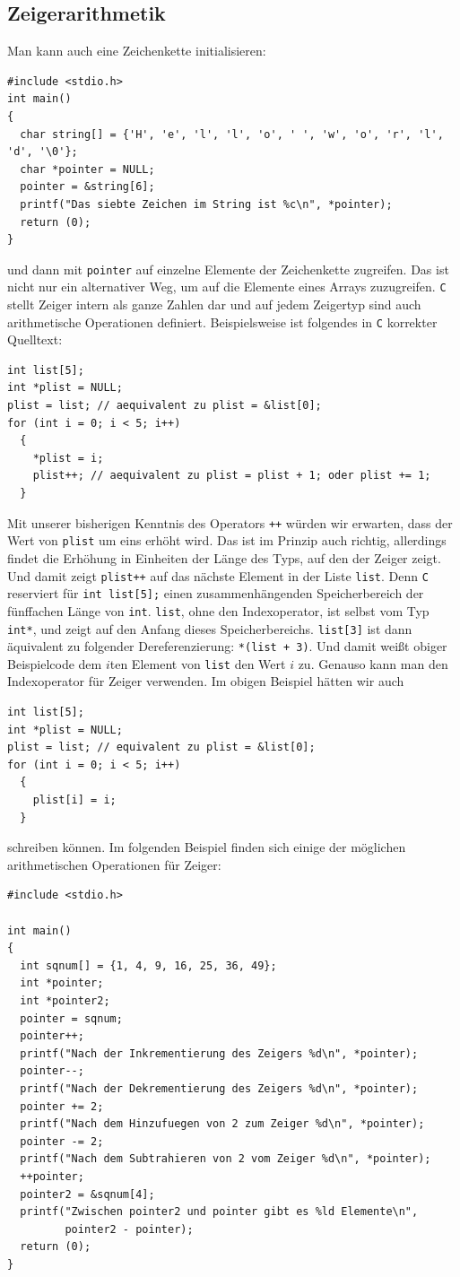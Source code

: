 \subsection{Zeigerarithmetik}

Man kann auch eine Zeichenkette initialisieren:
\begin{lstlisting}
#include <stdio.h>
int main()
{
  char string[] = {'H', 'e', 'l', 'l', 'o', ' ', 'w', 'o', 'r', 'l', 'd', '\0'};
  char *pointer = NULL;
  pointer = &string[6];
  printf("Das siebte Zeichen im String ist %c\n", *pointer);
  return (0);
}
\end{lstlisting}
und dann mit \verb|pointer| auf einzelne Elemente der Zeichenkette zugreifen.
Das ist nicht nur ein alternativer Weg, um auf die Elemente eines Arrays zuzugreifen.
\texttt{C} stellt Zeiger intern als ganze Zahlen dar und auf jedem Zeigertyp sind auch arithmetische Operationen definiert.
Beispielsweise ist folgendes in \texttt{C} korrekter Quelltext:
\begin{lstlisting}
int list[5];
int *plist = NULL;
plist = list; // aequivalent zu plist = &list[0];
for (int i = 0; i < 5; i++)
  {
    *plist = i;
    plist++; // aequivalent zu plist = plist + 1; oder plist += 1;
  }
\end{lstlisting}
Mit unserer bisherigen Kenntnis des Operators \verb|++| würden wir erwarten, dass der Wert von \verb|plist| um eins erhöht wird.
Das ist im Prinzip auch richtig, allerdings findet die Erhöhung in Einheiten der Länge des Typs, auf den der Zeiger zeigt.
Und damit zeigt \verb|plist++| auf das nächste Element in der Liste \verb|list|.
Denn \texttt{C} reserviert für \verb|int list[5];| einen zusammenhängenden Speicherbereich der fünffachen Länge von \verb|int|.
\verb|list|, ohne den Indexoperator, ist selbst vom Typ \verb|int*|, und zeigt auf den Anfang dieses Speicherbereichs.
\verb|list[3]| ist dann äquivalent zu folgender Dereferenzierung: \verb|*(list + 3)|.
Und damit weißt obiger Beispielcode dem $i$ten Element von \verb|list| den Wert $i$ zu.
Genauso kann man den Indexoperator für Zeiger verwenden.
Im obigen Beispiel hätten wir auch
\begin{lstlisting}
int list[5];
int *plist = NULL;
plist = list; // equivalent zu plist = &list[0];
for (int i = 0; i < 5; i++)
  {
    plist[i] = i;
  }
\end{lstlisting}
schreiben können.
Im folgenden Beispiel finden sich einige der möglichen arithmetischen Operationen für Zeiger:
\begin{lstlisting}
#include <stdio.h>

int main()
{
  int sqnum[] = {1, 4, 9, 16, 25, 36, 49};
  int *pointer;
  int *pointer2;
  pointer = sqnum;
  pointer++;
  printf("Nach der Inkrementierung des Zeigers %d\n", *pointer);
  pointer--;
  printf("Nach der Dekrementierung des Zeigers %d\n", *pointer);
  pointer += 2;
  printf("Nach dem Hinzufuegen von 2 zum Zeiger %d\n", *pointer);
  pointer -= 2;
  printf("Nach dem Subtrahieren von 2 vom Zeiger %d\n", *pointer);
  ++pointer;
  pointer2 = &sqnum[4];
  printf("Zwischen pointer2 und pointer gibt es %ld Elemente\n",
         pointer2 - pointer);
  return (0);
}
\end{lstlisting}
